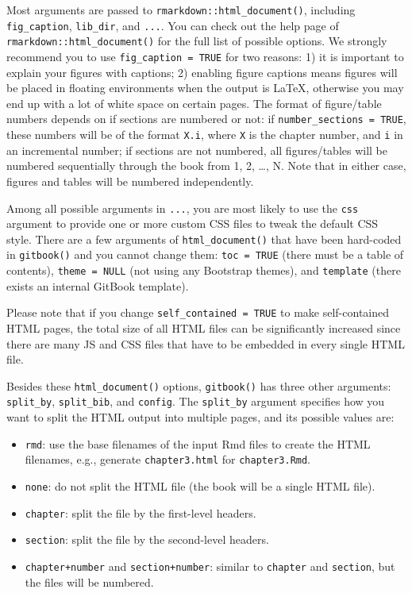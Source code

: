 \documentclass[
  12pt,
]{krantz}
\providecommand{\tightlist}{%
  \setlength{\itemsep}{0pt}\setlength{\parskip}{0pt}}
\theoremstyle{definition}
\theoremstyle{definition}
\theoremstyle{definition}
\theoremstyle{definition}
\theoremstyle{remark}
\begin{document}
Most arguments are passed to \texttt{rmarkdown::html\_document()}, including \texttt{fig\_caption}, \texttt{lib\_dir}, and \texttt{...}. You can check out the help page of \texttt{rmarkdown::html\_document()} for the full list of possible options. We strongly recommend you to use \texttt{fig\_caption\ =\ TRUE} for two reasons: 1) it is important to explain your figures with captions; 2) enabling figure captions means figures will be placed in floating environments when the output is LaTeX, otherwise you may end up with a lot of white space on certain pages. The format of figure/table numbers depends on if sections are numbered or not: if \texttt{number\_sections\ =\ TRUE}, these numbers will be of the format \texttt{X.i}, where \texttt{X} is the chapter number, and \texttt{i} in an incremental number; if sections are not numbered, all figures/tables will be numbered sequentially through the book from 1, 2, \ldots, N. Note that in either case, figures and tables will be numbered independently.

Among all possible arguments in \texttt{...}, you are most likely to use the \texttt{css} argument to provide one or more custom CSS files to tweak the default CSS style. There are a few arguments of \texttt{html\_document()} that have been hard-coded in \texttt{gitbook()} and you cannot change them: \texttt{toc\ =\ TRUE} (there must be a table of contents), \texttt{theme\ =\ NULL} (not using any Bootstrap themes), and \texttt{template} (there exists an internal GitBook template).

Please note that if you change \texttt{self\_contained\ =\ TRUE} to make self-contained HTML pages, the total size of all HTML files can be significantly increased since there are many JS and CSS files that have to be embedded in every single HTML file.

Besides these \texttt{html\_document()} options, \texttt{gitbook()} has three other arguments: \texttt{split\_by}, \texttt{split\_bib}, and \texttt{config}. The \texttt{split\_by} argument specifies how you want to split the HTML output into multiple pages, and its possible values are:

\begin{itemize}
\tightlist
\item
  \texttt{rmd}: use the base filenames of the input Rmd files to create the HTML filenames, e.g., generate \texttt{chapter3.html} for \texttt{chapter3.Rmd}.
\item
  \texttt{none}: do not split the HTML file (the book will be a single HTML file).
\item
  \texttt{chapter}: split the file by the first-level headers.
\item
  \texttt{section}: split the file by the second-level headers.
\item
  \texttt{chapter+number} and \texttt{section+number}: similar to \texttt{chapter} and \texttt{section}, but the files will be numbered.
\end{itemize}
\end{document}
